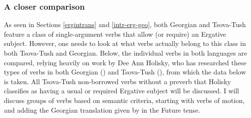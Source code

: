 \subsubsection{A closer comparison}


As seen in Sections \ref{ergintrans} and \ref{intr-erg-geo}, both Georgian and Tsova-Tush feature a class of single-argument verbs that allow (or require) an Ergative subject. However, one needs to look at what verbs actually belong to this class in both Tsova-Tush and Georgian. Below, the individual verbs in both languages are compared, relying heavily on work by Dee Ann Holisky, who has researched these types of verbs in both Georgian (\cites[]{holisky1981medial}) and Tsova-Tush (\cites[]{holisky87}), from which the data below is taken. All Tsova-Tush non-borrowed verbs without a preverb that Holisky classifies as having a usual or required Ergative subject will be discussed. I will discuss groups of verbs based on semantic criteria, starting with verbs of motion, and adding the Georgian translation given by \textcites[]{kadkad84} in the Future tense.



